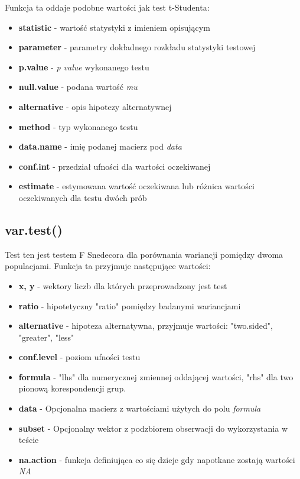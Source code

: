 \documentclass{article}
\begin{document}
Funkcja ta oddaje podobne wartości jak test t-Studenta:
\begin{itemize}
\item \textbf{statistic} - wartość statystyki z imieniem opisującym
\item \textbf{parameter} - parametry dokładnego rozkładu statystyki testowej
\item \textbf{p.value} - \textit{p value} wykonanego testu
\item \textbf{null.value} - podana wartość \textit{mu}
\item \textbf{alternative} - opis hipotezy alternatywnej
\item \textbf{method} - typ wykonanego testu
\item \textbf{data.name} - imię podanej macierz pod \textit{data}
\item \textbf{conf.int} - przedział ufności dla wartości oczekiwanej
\item \textbf{estimate} - estymowana wartość oczekiwana lub różnica wartości oczekiwanych dla testu dwóch prób
\end{itemize}

\subsection{var.test()}
Test ten jest testem F Snedecora dla porównania wariancji pomiędzy dwoma populacjami. Funkcja ta przyjmuje następujące wartości:
\begin{itemize}
\item \textbf{x, y} - wektory liczb dla których przeprowadzony jest test
\item \textbf{ratio} - hipotetyczny "ratio" pomiędzy badanymi wariancjami
\item \textbf{alternative} - hipoteza alternatywna, przyjmuje wartości: "two.sided", "greater", "less"
\item \textbf{conf.level} - poziom ufności testu
\item \textbf{formula} - "lhs" dla numerycznej zmiennej oddającej wartości, "rhs" dla two pionową korespondencji grup.
\item \textbf{data} - Opcjonalna macierz z wartościami użytych do polu \textit{formula}
\item \textbf{subset}  - Opcjonalny wektor z podzbiorem obserwacji do wykorzystania w teście
\item \textbf{na.action} - funkcja definiująca co się dzieje gdy napotkane zostają wartości \textit{NA}
\end{itemize}
\end{document}

